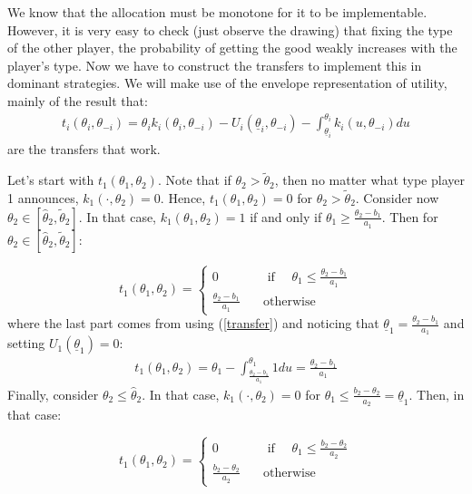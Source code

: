 \documentclass[a4paper]{article}
\begin{document}
We know that the allocation must be monotone for it to be implementable. However, it is very easy to check (just observe the drawing) that fixing the type of the other player, the probability of getting the good weakly increases with the player's type. Now we have to construct the transfers to implement this in dominant strategies. We will make use of the envelope representation of utility, mainly of the result that:
\begin{align} \label{transfer}
	t_i(\theta_i,\theta_{-i}) = \theta_i k_i(\theta_i,\theta_{-i}) - U_i(\underline{\theta}_{i}, \theta_{-i}) - \int_{\underline{\theta}_{i}}^{\theta_i} k_{i} (u,\theta_{-i}) du
\end{align}
are the transfers that work.

Let's start with $t_1(\theta_1,\theta_2)$. Note that if $\theta_2>\tilde{\theta}_2$, then no matter what type player 1 announces, $k_1(\cdot,\theta_2)=0$. Hence, $t_1(\theta_1,\theta_2)=0$ for $\theta_2>\tilde{\theta}_2$. Consider now $\theta_2\in[\hat{\theta}_2,\tilde{\theta}_2]$. In that case, $k_1(\theta_1,\theta_2)=1$ if and only if $\theta_1\geq\frac{\theta_2-b_1}{a_1}$. Then for $\theta_2\in[\hat{\theta}_2,\tilde{\theta}_2]$:

\[t_1(\theta_1,\theta_2)=\left\{\begin{array}{cc} 0 & \quad\text{ if }\quad  \theta_1\leq\frac{\theta_2-b_1}{a_1}\\
	\frac{\theta_2-b_1}{a_1} & \quad\text{otherwise}\quad
	
\end{array}
\right.
\]
where the last part comes from using (\ref{transfer}) and noticing that $\underline{\theta}_1=\frac{\theta_2-b_1}{a_1}$ and setting $U_1(\underline{\theta}_1)=0$:
\begin{align*}
	t_1(\theta_1,\theta_2)=\theta_1-\int_{\frac{\theta_2-b_1}{a_1}}^{\theta_1}1 du=\frac{\theta_2-b_1}{a_1}
\end{align*}
Finally, consider $\theta_2\leq\hat{\theta}_2$. In that case, $k_1(\cdot,\theta_2)=0$ for $\theta_1\leq \frac{b_2-\theta_2}{a_2}=\underline{\theta}_1$. Then, in that case:

\[t_1(\theta_1,\theta_2)=\left\{\begin{array}{cc} 0 & \quad\text{ if }\quad  \theta_1\leq\frac{b_2-\theta_2}{a_2}\\
	\frac{b_2-\theta_2}{a_2} & \quad\text{otherwise}\quad
	
\end{array}
\right.
\]
\end{document}
